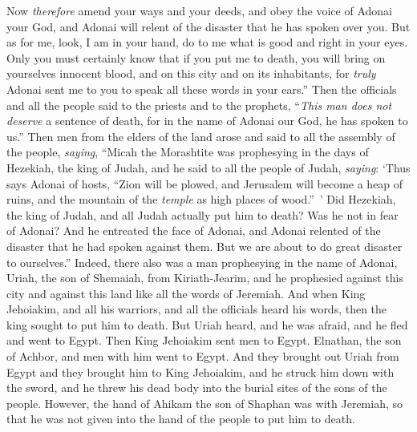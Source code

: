 \begin{biblechapter}
\verse Now \textit{therefore} amend your ways and your deeds, and obey the voice of Adonai your God, and Adonai will relent of the disaster that he has spoken over you.
\verse But as for me, look, I am in your hand, do to me what is good and right in your eyes.
\verse Only you must certainly know that if you put me to death, you will bring on yourselves innocent blood, and on this city and on its inhabitants, for \textit{truly} Adonai sent me to you to speak all these words in your ears.”
\verse Then the officials and all the people said to the priests and to the prophets, “\textit{This man does not deserve} a sentence of death, for in the name of Adonai our God, he has spoken to us.”
\verse Then men from the elders of the land arose and said to all the assembly of the people, \textit{saying},
\verse “Micah the Morashtite was prophesying in the days of Hezekiah, the king of Judah, and he said to all the people of Judah, \textit{saying}: ‘Thus says Adonai of hosts, 
“Zion will be plowed, 
and Jerusalem will become a heap of ruins, 
and the mountain of the \textit{temple} as high places of wood.” ’
\verse Did Hezekiah, the king of Judah, and all Judah actually put him to death? Was he not in fear of Adonai? And he entreated the face of Adonai, and Adonai relented of the disaster that he had spoken against them. But we are about to do great disaster to ourselves.”
\verse Indeed, there also was a man prophesying in the name of Adonai, Uriah, the son of Shemaiah, from Kiriath-Jearim, and he prophesied against this city and against this land like all the words of Jeremiah.
\verse And when King Jehoiakim, and all his warriors, and all the officials heard his words, then the king sought to put him to death. But Uriah heard, and he was afraid, and he fled and went to Egypt.
\verse Then King Jehoiakim sent men to Egypt. Elnathan, the son of Achbor, and men with him went to Egypt.
\verse And they brought out Uriah from Egypt and they brought him to King Jehoiakim, and he struck him down with the sword, and he threw his dead body into the burial sites of the sons of the people.
\verse However, the hand of Ahikam the son of Shaphan was with Jeremiah, so that he was not given into the hand of the people to put him to death.
\end{biblechapter}

